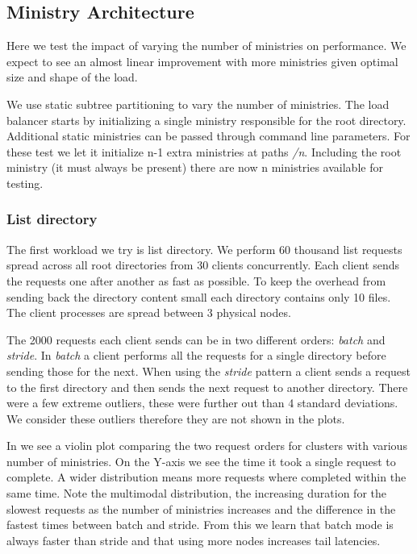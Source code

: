 \subsection{Ministry Architecture} \label{sec:res_arg}
Here we test the impact of varying the number of ministries on performance. We expect to see an almost linear improvement with more ministries given optimal size and shape of the load.

We use static subtree partitioning to vary the number of ministries. The load balancer starts by initializing a single ministry responsible for the root directory. Additional static ministries can be passed through command line parameters. For these test we let it initialize n-1 extra ministries at paths \textsl{/n}. Including the root ministry (it must always be present) there are now n ministries available for testing.

\subsubsection*{List directory}
The first workload we try is list directory. We perform 60 thousand list requests spread across all root directories from 30 clients concurrently. Each client sends the requests one after another as fast as possible. To keep the overhead from sending back the directory content small each directory contains only 10 files. The client processes are spread between 3 physical nodes.

The 2000 requests each client sends can be in two different orders: \textit{batch} and \textit{stride}. In \textit{batch} a client performs all the requests for a single directory before sending those for the next. When using the \textit{stride} pattern a client sends a request to the first directory and then sends the next request to another directory. There were a few extreme outliers, these were further out than 4 standard deviations. We consider these outliers therefore they are not shown in the plots. 

In  we see a violin plot comparing the two request orders for clusters with various number of ministries. On the Y-axis we see the time it took a single request to complete. A wider distribution means more requests where completed within the same time. Note the multimodal distribution, the increasing duration for the slowest requests as the number of ministries increases and the difference in the fastest times between batch and stride. From this we learn that batch mode is always faster than stride and that using more nodes increases tail latencies.

